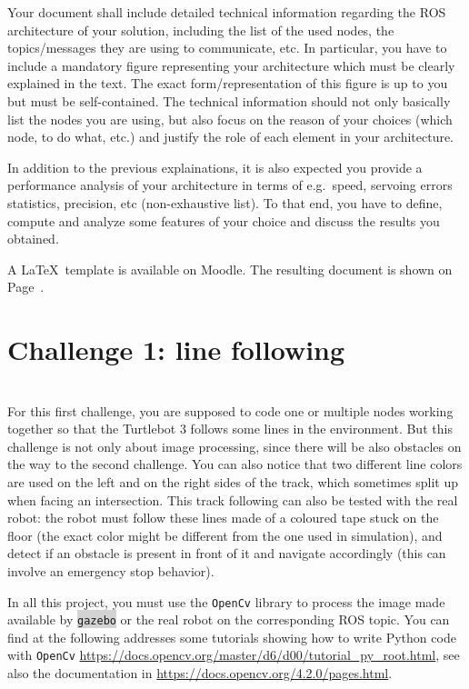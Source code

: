 \documentclass[10pt,a4paper,printanswers]{upmc}
\newcommand{\myline}{\noindent\makebox[\linewidth]{\rule{\textwidth}{0.7pt}}}
\newcommand{\mytext}[1]{\colorbox{lightgray}{\texttt{#1}}}
\begin{document}
Your document shall include detailed technical information regarding the ROS architecture of your
solution, including the list of the used nodes, the topics/messages they are using to communicate,
etc. In particular, you have to include a mandatory figure representing your architecture which must
be clearly explained in the text. The exact form/representation of this figure is up to you but must
be self-contained. The technical information should not only basically list the nodes you are using,
but also focus on the reason of your choices (which node, to do what, etc.) and justify the role of
each element in your architecture.

In addition to the previous explainations, it is also expected you provide a performance analysis of
your architecture in terms of e.g.\ speed, servoing errors statistics, precision, etc
(non-exhaustive list). To that end, you have to define, compute and analyze some features of your
choice and discuss the results you obtained.

A \LaTeX~template is available on Moodle. The resulting document is shown on
Page~\pageref{sec:report}.

\newpage
\section{Challenge 1: line following}
\vspace{-0.5cm}\myline\\

For this first challenge, you are supposed to code one or multiple nodes working together so that
the Turtlebot 3 follows some lines in the environment. But this challenge is not only about image
processing, since there will be also obstacles on the way to the second challenge.
%
You can also notice that two different line colors are used on the left and on the right sides of
the track, which sometimes split up when facing an intersection. This track following can also be
tested with the real robot: the robot must follow these lines made of a coloured tape stuck on the
floor (the exact color might be different from the one used in simulation), and detect if an
obstacle is present in front of it and navigate accordingly (this can involve an emergency stop
behavior).

In all this project, you must use the \texttt{OpenCv} library to process the image made available by
\mytext{gazebo} or the real robot on the corresponding ROS topic. You can find at the following
addresses some tutorials showing how to write Python code with \texttt{OpenCv}
\url{https://docs.opencv.org/master/d6/d00/tutorial_py_root.html}, see also the documentation in
\url{https://docs.opencv.org/4.2.0/pages.html}.\\
\end{document}
